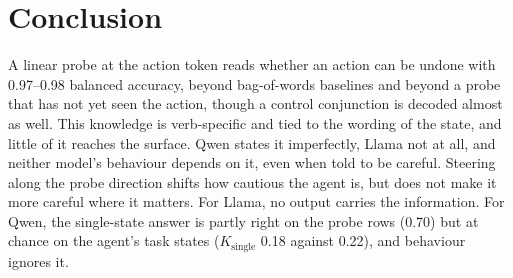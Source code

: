 \documentclass[conference]{IEEEtran}
\begin{document}
\section{Conclusion}
A linear probe at the action token reads whether an action can be undone with 0.97--0.98 balanced accuracy, beyond bag-of-words baselines and beyond a probe that has not yet seen the action, though a control conjunction is decoded almost as well. This knowledge is verb-specific and tied to the wording of the state, and little of it reaches the surface. Qwen states it imperfectly, Llama not at all, and neither model's behaviour depends on it, even when told to be careful. Steering along the probe direction shifts how cautious the agent is, but does not make it more careful where it matters. For Llama, no output carries the information. For Qwen, the single-state answer is partly right on the probe rows (0.70) but at chance on the agent's task states ($K_\mathrm{single}$ 0.18 against 0.22), and behaviour ignores it.



\end{document}

